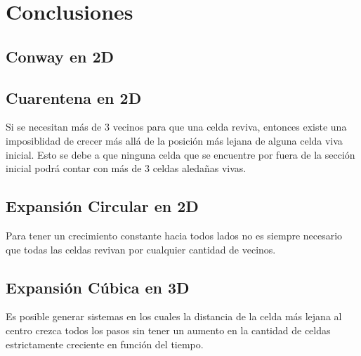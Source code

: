 \section{Conclusiones}\label{sec:conclusiones}

\subsection{Conway en 2D}\label{subsec:conway-en-2d-conc}

\subsection{Cuarentena en 2D}\label{subsec:cuarentena-2D-conc}

Si se necesitan más de 3 vecinos para que una celda reviva, entonces existe una imposiblidad de crecer más allá de la posición más lejana
de alguna celda viva inicial. Esto se debe a que ninguna celda que se encuentre por fuera de la sección inicial podrá contar con más de
3 celdas aledañas vivas.

\subsection{Expansión Circular en 2D}\label{subsec:expansion-circular-2D-conc}

Para tener un crecimiento constante hacia todos lados no es siempre necesario que todas las celdas revivan por cualquier cantidad de vecinos.

\subsection{Expansión Cúbica en 3D}\label{subsec:cubito-3D-conc}

Es posible generar sistemas en los cuales la distancia de la celda más lejana al centro crezca todos los pasos sin tener un aumento en la
cantidad de celdas estrictamente creciente en función del tiempo.
